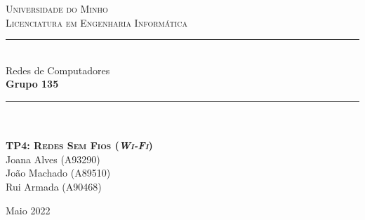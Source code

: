 \documentclass[12pt]{article}
\begin{document}
\begin{titlepage}

\center %

\newcommand{\HRule}{\rule{\linewidth}{0.4mm}} %

\textsc{\LARGE Universidade do Minho}\\[0.5cm]  %

\vspace{1cm}
\textsc{\large Licenciatura em Engenharia Informática}\\[1.5cm] %
\vspace{0.5cm}

\HRule \\[0.5cm]
{ \LARGE \bfseries } Redes de Computadores \\[0.5cm] %
{ \LARGE \bfseries } \textbf{Grupo 135} \\[0.5cm] %
\HRule \\[1cm]
\vspace{0.1cm}
 
\paragraph{}
\paragraph{}
\textsc{\Large \textbf{TP4: Redes Sem Fios (\textit{Wi-Fi})}}\\[0.75cm] %
\vspace{2.5cm} %
Joana Alves (A93290) \\ \vspace{3mm}
João Machado (A89510) \\ \vspace{3mm} 
Rui Armada (A90468) \\ \vspace{3mm}

\vspace{3cm}


\vspace*{\fill}

{\large Maio 2022}\\[2cm] %

\vfill %
\end{titlepage}
\end{document}
